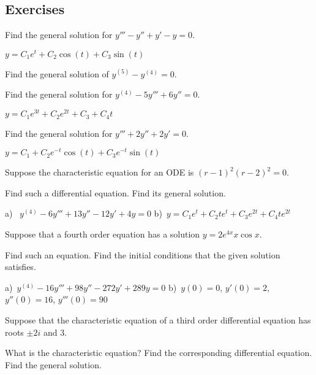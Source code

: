 \subsection{Exercises}

\begin{exercise}
Find the general solution for $y''' - y'' + y' - y = 0$.
\end{exercise}
\comboSol{%
}
{%
$y = C_1e^t + C_2\cos(t) + C_3\sin(t)$
}

\begin{exercise}\ansMark%
Find the general solution of $y^{(5)}-y^{(4)}=0$.
\end{exercise}

\begin{exercise}
Find the general solution for $y^{(4)} - 5 y''' + 6 y'' = 0$.
\end{exercise}
\comboSol{%
}
{%
$y = C_1e^{3t} + C_2e^{2t} + C_3 + C_4t$
}

\begin{exercise}
Find the general solution for $y''' + 2 y'' + 2 y' = 0$.
\end{exercise}
\comboSol{%
}
{%
$y = C_1 + C_2e^{-t}\cos(t) + C_3e^{-t}\sin(t)$
}

\begin{exercise}
Suppose the characteristic equation for an ODE is
${(r-1)}^2{(r-2)}^2 = 0$.
\begin{tasks}
\task
Find such a differential equation.
\task
Find its general solution.
\end{tasks}
\end{exercise}
\comboSol{%
}
{%
a)~ $y^{(4)} - 6y''' + 13y'' - 12y' + 4y = 0$ \quad b)~$y = C_1e^t + C_2te^t + C_3e^{2t} + C_4te^{2t}$
}

\begin{exercise} \label{hol:eqfromsolex}
Suppose that a fourth order equation has a solution
$y = 2 e^{4x} x \cos x$.  
\begin{tasks}
\task
Find such an equation.
\task
Find the initial conditions that the given
solution satisfies.
\end{tasks}
\end{exercise}
\comboSol{%
}
{%
a)~$y^{(4)} - 16y''' + 98y'' - 272y' + 289y = 0$ \quad b)~$y(0) = 0$, $y'(0) = 2$, $y''(0) = 16$, $y'''(0) = 90$
}

\begin{exercise}\ansMark
\pagebreak[2]
Suppose that the characteristic equation of a third order differential
equation has
roots $\pm 2i$ and 3.
\begin{tasks}
\task
What is the characteristic equation?
\task
Find the
corresponding differential equation.
\task
Find the general solution.
\end{tasks}
\end{exercise}

